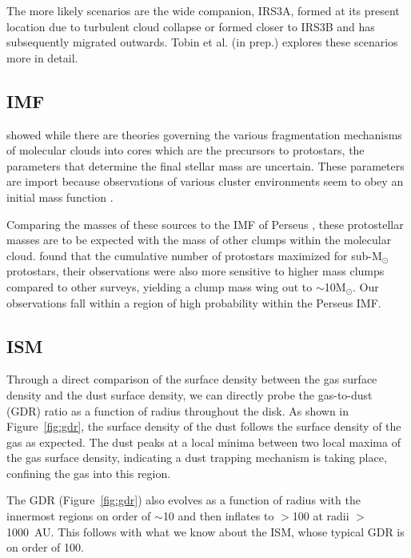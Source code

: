 \documentclass[preprint,12pt]{aastex62}
\newcommand{\ab}{$\sim$}
\newcommand{\solm}{M$_{\odot}$}
\begin{document}
The more likely scenarios are the wide companion, IRS3A, formed at its present location due to turbulent cloud collapse or formed closer to IRS3B and has subsequently migrated outwards. Tobin et al. (in prep.) explores these scenarios more in detail.

\subsection{IMF}
\citet{1998ApJ...501L.205K} showed while there are theories governing the various fragmentation mechanisms of molecular clouds into cores which are the precursors to protostars, the parameters that determine the final stellar mass are uncertain. These parameters are import because observations of various cluster environments seem to obey an initial mass function \citep[e.g][]{1955ApJ...121..161S,2003ARAA..41...57L}.

Comparing the masses of these sources to the IMF of Perseus \citep{2006ApJ...646.1009K}, these protostellar masses are to be expected with the mass of other clumps within the molecular cloud. 
\citet{2009ApJ...692..973E} found that the cumulative number of protostars maximized for sub-\solm\space protostars, their observations were also more sensitive to higher mass clumps compared to other surveys, yielding a clump mass wing out to \ab10\solm. Our observations fall within a region of high probability within the Perseus IMF.

\subsection{ISM}
Through a direct comparison of the surface density between the gas surface density and the dust surface density, we can directly probe the gas-to-dust (GDR) ratio as a function of radius throughout the disk. As shown in Figure~\ref{fig:gdr}, the surface density of the dust follows the surface density of the gas as expected. The dust peaks at a local minima between two local maxima of the gas surface density, indicating a dust trapping mechanism is taking place, confining the gas into this region. 

The GDR (Figure~\ref{fig:gdr}) also evolves as a function of radius with the innermost regions on order of \ab10 and then inflates to $>$100 at radii $>$1000~AU. This follows with what we know about the ISM, whose typical GDR is on order of 100. 
\end{document}
